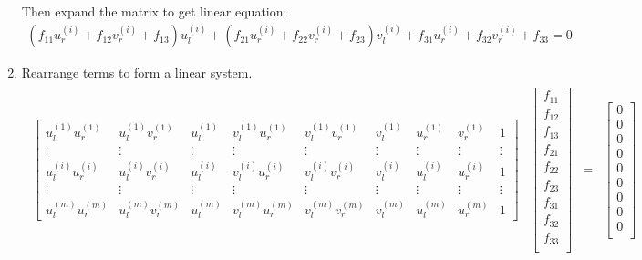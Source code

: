 \begin{enumerate}
    Then expand the matrix to get linear equation: 
    \begin{align*}
        \left(f_{11} u_{r}^{(i)}+f_{12} v_{r}^{(i)}+f_{13}\right) u_{l}^{(i)}+\left(f_{21} u_{r}^{(i)}+f_{22} v_{r}^{(i)}+f_{23}\right) v_{l}^{(i)}+f_{31} u_{r}^{(i)}+f_{32} v_{r}^{(i)}+f_{33}=0
    \end{align*}
    \item Rearrange terms to form a linear system.
    \begin{align*}
        \begin{array}{cccc}
            \begin{bmatrix}
                u_{l}^{(1)} u_{r}^{(1)} & u_{l}^{(1)} v_{r}^{(1)} & u_{l}^{(1)} & v_{l}^{(1)} u_{r}^{(1)} & v_{l}^{(1)} v_{r}^{(1)} & v_{l}^{(1)} & u_{r}^{(1)} & v_{r}^{(1)} & 1 \\
                \vdots & \vdots & \vdots & \vdots & \vdots & \vdots & \vdots & \vdots & \vdots \\
                u_{l}^{(i)} u_{r}^{(i)} & u_{l}^{(i)} v_{r}^{(i)} & u_{l}^{(i)} & v_{l}^{(i)} u_{r}^{(i)} & v_{l}^{(i)} v_{r}^{(i)} & v_{l}^{(i)} & u_{l}^{(i)} & u_{r}^{(i)} & 1 \\
                \vdots & \vdots & \vdots & \vdots & \vdots & \vdots & \vdots & \vdots & \vdots \\
                u_{l}^{(m)} u_{r}^{(m)} & u_{l}^{(m)} v_{r}^{(m)} & u_{l}^{(m)} & v_{l}^{(m)} u_{r}^{(m)} & v_{l}^{(m)} v_{r}^{(m)} & v_{l}^{(m)} & u_{l}^{(m)} & u_{r}^{(m)} & 1
            \end{bmatrix}&\begin{bmatrix}
                f_{11}\\f_{12}\\f_{13}\\
                f_{21}\\f_{22}\\f_{23}\\
                f_{31}\\f_{32}\\f_{33}\\
            \end{bmatrix}&=&\begin{bmatrix}
                0\\0\\0\\
                0\\0\\0\\
                0\\0\\0\\

\end{bmatrix}
\end{array}
\end{align*}
\end{enumerate}
